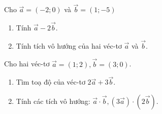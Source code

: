 \begin{bt}%
	Cho $\overrightarrow{a}=(-2;0)$ và $\overrightarrow{b}=(1;-5)$
	\begin{enumerate}
		\item Tính $\overrightarrow{a}-2 \overrightarrow{b}$.
		\item Tính tích vô hướng của hai véc-tơ $\overrightarrow{a}$ và $\overrightarrow{b}$.
	\end{enumerate}
\end{bt}

\begin{bt}%
	Cho hai véc-tơ $\overrightarrow{a}=(1;2),\overrightarrow{b}=(3;0)$.
	\begin{enumerate}
		\item Tìm toạ độ của véc-tơ $2\overrightarrow{a}+3\overrightarrow{b}$.
		\item Tính các tích vô hướng: $\overrightarrow{a} \cdot \overrightarrow{b},(3\overrightarrow{a}) \cdot (2\overrightarrow{b})$.
	\end{enumerate}
\end{bt}


